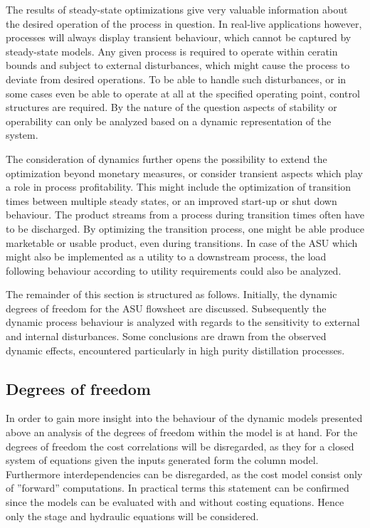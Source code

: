    The results of steady-state optimizations give very valuable information about the desired operation of
    the process in question. In real-live applications however, processes will always display transient behaviour,
    which cannot be captured by steady-state models. Any given process is required
    to operate within ceratin bounds and subject to external disturbances, which might cause the process to deviate
    from desired operations. To be able to handle such disturbances, or in some cases even be able
    to operate at all at the specified operating point, control structures are required. By the nature of the question 
    aspects of stability or operability can only be analyzed based on a dynamic representation of the system. 

    The consideration of dynamics further opens the possibility to extend the optimization beyond monetary measures, or
    consider transient aspects which play a role in process profitability. This might include the optimization of transition
    times between multiple steady states, or an improved start-up or shut down behaviour. The product streams from a process 
    during transition times often have to be discharged. By optimizing the transition process, one might be able produce 
    marketable or usable product, even during transitions. In case of the ASU which might also be implemented as a utility 
    to a downstream process, the load following behaviour according to utility requirements could also be analyzed.
    
    The remainder of this section is structured as follows. Initially, the dynamic degrees of freedom for the ASU
    flowsheet are discussed. Subsequently the dynamic process behaviour is analyzed with regards to the sensitivity 
    to external and internal disturbances. Some conclusions are drawn from the observed dynamic effects, encountered 
    particularly in high purity distillation processes. 

    \subsection{Degrees of freedom}
        In order to gain more insight into the behaviour of the dynamic models presented above an analysis
        of the degrees of freedom within the model is at hand. For the degrees of freedom the cost correlations
        will be disregarded, as they for a closed system of equations given the inputs generated form the column
        model. Furthermore interdependencies can be disregarded, as the cost model consist only of ''forward''
        computations. In practical terms this statement can be confirmed since the models can be evaluated
        with and without costing equations. Hence only the stage and hydraulic equations will be considered.

